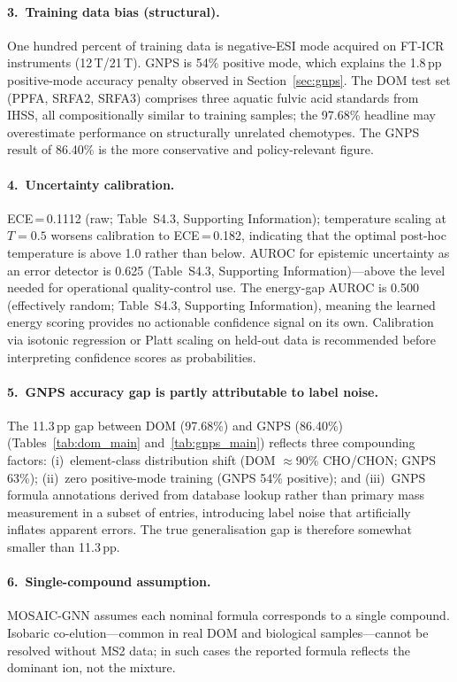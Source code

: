 \documentclass[journal=jcisd8]{achemso}
\begin{document}
\paragraph{3.\ Training data bias (structural).}
One hundred percent of training data is negative-ESI mode acquired on FT-ICR
instruments (12\,T/21\,T).
GNPS is 54\% positive mode, which explains the 1.8\,pp positive-mode accuracy
penalty observed in Section~\ref{sec:gnps}.
The DOM test set (PPFA, SRFA2, SRFA3) comprises three aquatic fulvic acid standards
from IHSS, all compositionally similar to training samples; the 97.68\% headline
may overestimate performance on structurally unrelated chemotypes.
The GNPS result of 86.40\% is the more conservative and policy-relevant figure.

\paragraph{4.\ Uncertainty calibration.}
ECE\,=\,0.1112 (raw; Table~S4.3, Supporting Information); temperature scaling at $T=0.5$ worsens
calibration to ECE\,=\,0.182, indicating that the optimal post-hoc temperature is
above 1.0 rather than below.
AUROC for epistemic uncertainty as an error detector is 0.625
(Table~S4.3, Supporting Information)---above the level needed for operational quality-control use.
The energy-gap AUROC is 0.500 (effectively random; Table~S4.3, Supporting Information), meaning
the learned energy scoring provides no actionable confidence signal on its own.
Calibration via isotonic regression or Platt scaling on held-out data is recommended
before interpreting confidence scores as probabilities.

\paragraph{5.\ GNPS accuracy gap is partly attributable to label noise.}
The 11.3\,pp gap between DOM (97.68\%) and GNPS (86.40\%)
(Tables~\ref{tab:dom_main} and~\ref{tab:gnps_main}) reflects three compounding factors: (i)~element-class distribution shift (DOM $\approx$90\%
CHO/CHON; GNPS 63\%); (ii)~zero positive-mode training (GNPS 54\% positive);
and (iii)~GNPS formula annotations derived from database lookup rather than
primary mass measurement in a subset of entries, introducing label noise that
artificially inflates apparent errors.
The true generalisation gap is therefore somewhat smaller than 11.3\,pp.

\paragraph{6.\ Single-compound assumption.}
MOSAIC-GNN assumes each nominal formula corresponds to a single compound.
Isobaric co-elution---common in real DOM and biological samples---cannot be
resolved without MS2 data; in such cases the reported formula reflects the
dominant ion, not the mixture.
\end{document}
